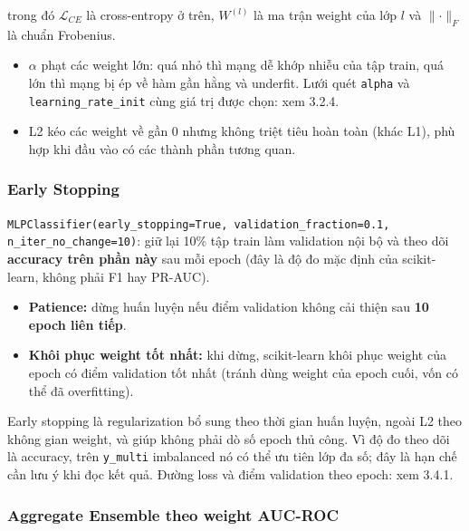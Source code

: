 \documentclass[a4paper]{report}
\begin{document}
trong đó $\mathcal{L}_{CE}$ là cross-entropy ở trên, $W^{(l)}$ là ma trận weight của lớp $l$ và $\lVert\cdot\rVert_F$ là chuẩn Frobenius.

\begin{itemize}
  \item $\alpha$ phạt các weight lớn: quá nhỏ thì mạng dễ khớp nhiễu của tập train, quá lớn thì mạng bị ép về hàm gần hằng và underfit. Lưới quét \texttt{alpha} và \texttt{learning\_\allowbreak{}rate\_\allowbreak{}init} cùng giá trị được chọn: xem 3.2.4.
  \item L2 kéo các weight về gần 0 nhưng không triệt tiêu hoàn toàn (khác L1), phù hợp khi đầu vào có các thành phần tương quan.
\end{itemize}

\subsubsection{Early Stopping}

\texttt{MLPClassifier(\allowbreak{}early\_\allowbreak{}stopping=True,\allowbreak{} validation\_\allowbreak{}fraction=0.1,\allowbreak{} n\_\allowbreak{}iter\_\allowbreak{}no\_\allowbreak{}change=10)}: giữ lại 10\% tập train làm validation nội bộ và theo dõi \textbf{accuracy trên phần này} sau mỗi epoch (đây là độ đo mặc định của scikit-learn, không phải F1 hay PR-AUC).

\begin{itemize}
  \item \textbf{Patience:} dừng huấn luyện nếu điểm validation không cải thiện sau \textbf{10 epoch liên tiếp}.
  \item \textbf{Khôi phục weight tốt nhất:} khi dừng, scikit-learn khôi phục weight của epoch có điểm validation tốt nhất (tránh dùng weight của epoch cuối, vốn có thể đã overfitting).
\end{itemize}

Early stopping là regularization bổ sung theo thời gian huấn luyện, ngoài L2 theo không gian weight, và giúp không phải dò số epoch thủ công. Vì độ đo theo dõi là accuracy, trên \texttt{y\_\allowbreak{}multi} imbalanced nó có thể ưu tiên lớp đa số; đây là hạn chế cần lưu ý khi đọc kết quả. Đường loss và điểm validation theo epoch: xem 3.4.1.

\subsubsection{Aggregate Ensemble theo weight AUC-ROC}
\end{document}
